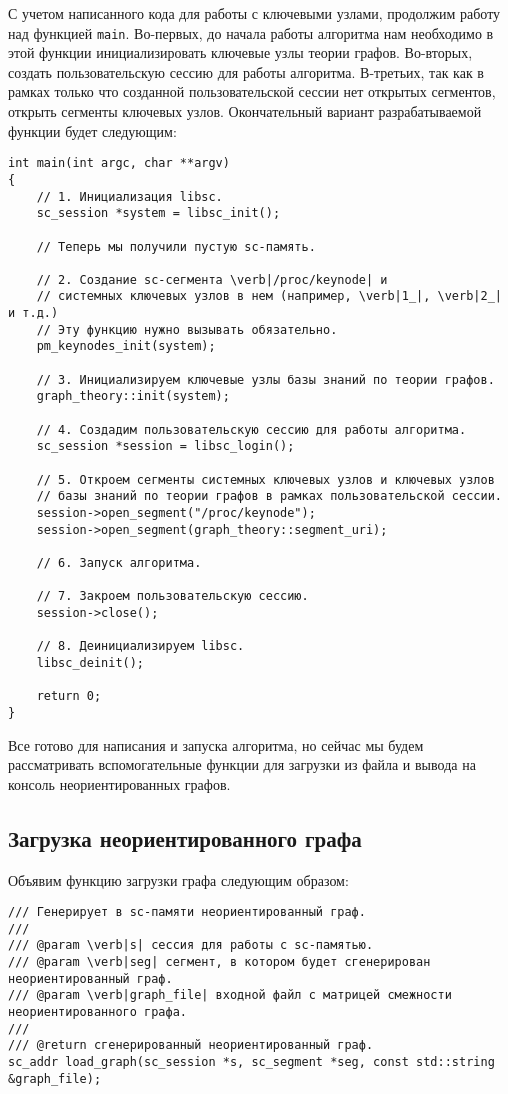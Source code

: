 С учетом написанного кода для работы с ключевыми узлами, продолжим
работу над функцией \lstinline|main|. Во-первых, до начала работы
алгоритма нам необходимо в этой функции инициализировать ключевые узлы
теории графов. Во-вторых, создать пользовательскую сессию для работы
алгоритма. В-третьих, так как в рамках только что созданной
пользовательской сессии нет открытых сегментов, открыть сегменты
ключевых узлов. Окончательный вариант разрабатываемой
функции будет следующим:
\begin{lstlisting}[texcl]
int main(int argc, char **argv)
{
    // 1. Инициализация libsc.
    sc_session *system = libsc_init();

    // Теперь мы получили пустую sc-память.

    // 2. Создание sc-сегмента \verb|/proc/keynode| и
    // системных ключевых узлов в нем (например, \verb|1_|, \verb|2_| и т.д.)
    // Эту функцию нужно вызывать обязательно.
    pm_keynodes_init(system);

    // 3. Инициализируем ключевые узлы базы знаний по теории графов.
    graph_theory::init(system);

    // 4. Создадим пользовательскую сессию для работы алгоритма.
    sc_session *session = libsc_login();

    // 5. Откроем сегменты системных ключевых узлов и ключевых узлов
    // базы знаний по теории графов в рамках пользовательской сессии.
    session->open_segment("/proc/keynode");
    session->open_segment(graph_theory::segment_uri);

    // 6. Запуск алгоритма.

    // 7. Закроем пользовательскую сессию.
    session->close();

    // 8. Деинициализируем libsc.
    libsc_deinit();

    return 0;
}
\end{lstlisting}

Все готово для написания и запуска алгоритма, но сейчас мы будем
рассматривать вспомогательные функции для загрузки из файла и вывода
на консоль неориентированных графов.

\subsection{Загрузка неориентированного графа}
\label{sec:libscprg_load_graph}

Объявим функцию загрузки графа следующим образом:
\begin{lstlisting}[texcl]
/// Генерирует в sc-памяти неориентированный граф.
///
/// @param \verb|s| сессия для работы с sc-памятью.
/// @param \verb|seg| сегмент, в котором будет сгенерирован неориентированный граф.
/// @param \verb|graph_file| входной файл с матрицей смежности неориентированного графа.
///
/// @return сгенерированный неориентированный граф.
sc_addr load_graph(sc_session *s, sc_segment *seg, const std::string &graph_file);
\end{lstlisting}

